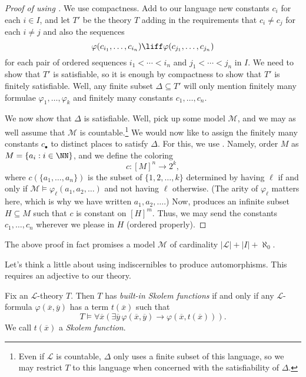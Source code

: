 \documentclass[../notes.tex]{subfiles}
\begin{document}
\begin{proof}[Proof of  using ]
	We use compactness. Add to our language new constants $c_i$ for each $i\in I$, and let $T'$ be the theory $T$ adding in the requirements that $c_i\ne c_j$ for each $i\ne j$ and also the sequences
	\[\varphi(c_{i_1},\ldots,c_{i_n})\liff\varphi(c_{j_1},\ldots,c_{j_n})\]
	for each pair of ordered sequences $i_1<\cdots<i_n$ and $j_1<\cdots<j_n$ in $I$. We need to show that $T'$ is satisfiable, so it is enough by compactness to show that $T'$ is finitely satisfiable. Well, any finite subset $\Delta\subseteq T'$ will only mention finitely many formulae $\varphi_1,\ldots,\varphi_k$ and finitely many constants $c_1,\ldots,c_n$.

	We now show that $\Delta$ is satisfiable. Well, pick up some model $\mathcal M$, and we may as well assume that $\mathcal M$ is countable.\footnote{Even if $\mathcal L$ is countable, $\Delta$ only uses a finite subset of this language, so we may restrict $T$ to this language when concerned with the satisfiability of $\Delta$.} We would now like to assign the finitely many constants $c_\bullet$ to distinct places to satisfy $\Delta$. For this, we use . Namely, order $M$ as $M=\{a_i:i\in\NN\}$, and we define the coloring
	\[c\colon[M]^n\to 2^k,\]
	where $c(\{a_1,\ldots,a_n\})$ is the subset of $\{1,2,\ldots,k\}$ determined by having $\ell$ if and only if $\mathcal M\models\varphi_\ell(a_1,a_2,\ldots)$ and not having $\ell$ otherwise. (The arity of $\varphi_\ell$ matters here, which is why we have written $a_1,a_2,\ldots$.) Now,  produces an infinite subset $H\subseteq M$ such that $c$ is constant on $[H]^m$. Thus, we may send the constants $c_1,\ldots,c_n$ wherever we please in $H$ (ordered properly).
\end{proof}
\begin{remark}
	The above proof in fact promises a model $\mathcal M$ of cardinality $\left|\mathcal L\right|+\left|I\right|+\aleph_0$.
\end{remark}
Let's think a little about using indiscernibles to produce automorphisms. This requires an adjective to our theory.
\begin{definition}
	Fix an $\mathcal L$-theory $T$. Then $T$ has \textit{built-in Skolem functions} if and only if any $\mathcal L$-formula $\varphi(\overline x,\overline y)$ has a term $t(\overline x)$ such that
	\[T\models\forall\overline x(\exists\overline y\,\varphi(\overline x,\overline y)\to\varphi(\overline x,t(\overline x))).\]
	We call $t(\overline x)$ a \textit{Skolem function}.
\end{definition}
\end{document}
